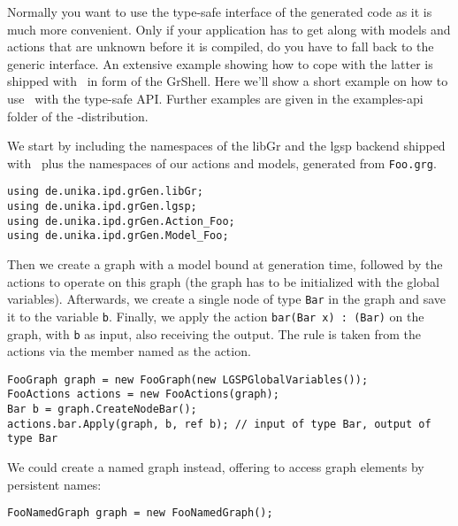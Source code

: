 \begin{example}\label{ex:api1}
Normally you want to use the type-safe interface of the generated code as it is much more convenient.
Only if your application has to get along with models and actions that are unknown before it is compiled, do you have to fall back to the generic interface.
An extensive example showing how to cope with the latter is shipped with \GrG\ in form of the GrShell.
Here we'll show a short example on how to use \GrG\ with the type-safe API.
Further examples are given in the examples-api folder of the \GrG-distribution.

We start by including the namespaces of the libGr and the lgsp backend shipped with \GrG\,
plus the namespaces of our actions and models, generated from \texttt{Foo.grg}.
\begin{verbatim}
using de.unika.ipd.grGen.libGr;
using de.unika.ipd.grGen.lgsp;
using de.unika.ipd.grGen.Action_Foo;
using de.unika.ipd.grGen.Model_Foo;
\end{verbatim}

Then we create a graph with a model bound at generation time, followed by the actions to operate on this graph (the graph has to be initialized with the global variables).
Afterwards, we create a single node of type \texttt{Bar} in the graph and save it to the variable \texttt{b}.
Finally, we apply the action \texttt{bar(Bar x) : (Bar)} on the graph, with \texttt{b} as input, also receiving the output.
The rule is taken from the actions via the member named as the action.
\begin{verbatim}
FooGraph graph = new FooGraph(new LGSPGlobalVariables());
FooActions actions = new FooActions(graph);
Bar b = graph.CreateNodeBar();
actions.bar.Apply(graph, b, ref b); // input of type Bar, output of type Bar
\end{verbatim}

We could create a named graph instead, offering to access graph elements by persistent names:
\begin{verbatim}
FooNamedGraph graph = new FooNamedGraph();
\end{verbatim}
\end{example}

